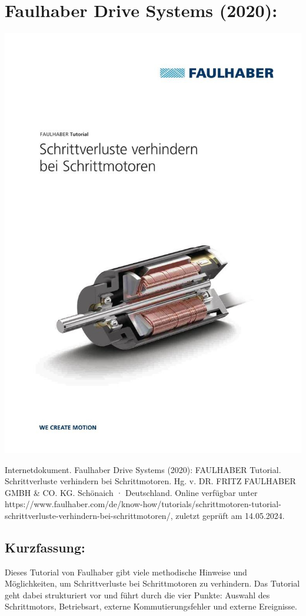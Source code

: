 \section*{Faulhaber Drive Systems (2020):}
\begin{minipage}{0.5\textwidth}
	\includegraphics[width=\linewidth]{../Appendix/Literaturverzeichnis/img/Faulhaber.jpg}
\end{minipage}
\hfill
\begin{minipage}{0.48\textwidth}
Internetdokument. Faulhaber Drive Systems (2020):
FAULHABER Tutorial. Schrittverluste verhindern bei Schrittmotoren.
Hg. v. DR. FRITZ FAULHABER GMBH \& CO. KG. Schönaich · Deutschland. Online verfügbar unter https://www.faulhaber.com/de/know-how/tutorials/schrittmotoren-tutorial-schrittverluste-verhindern-bei-schrittmotoren/, zuletzt geprüft am 14.05.2024.
\subsection*{Kurzfassung:}
Dieses Tutorial von Faulhaber gibt viele methodische Hinweise und Möglichkeiten, um Schrittverluste bei Schrittmotoren zu verhindern. Das Tutorial geht dabei strukturiert vor und führt durch die vier Punkte: Auswahl des Schrittmotors, Betriebsart, externe Kommutierungsfehler und externe Ereignisse.
\end{minipage}
